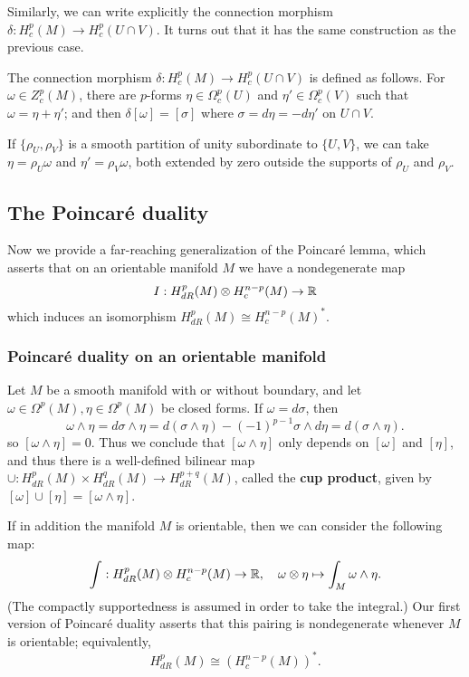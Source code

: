 Similarly, we can write explicitly the connection morphism $\delta:H^p_c(M)\to H^p_c(U\cap V)$. It turns out that it has the same construction as the previous case.
\begin{corollary}\label{Mayer-Vietoris de Rham compact connect}
The connection morphism $\delta:H^p_c(M)\to H^p_c(U\cap V)$ is defined as follows. For $\omega\in Z^p_c(M)$, there are $p$-forms $\eta\in\Omega^p_c(U)$ and 
$\eta'\in\Omega^p_c(V)$ such that $\omega=\eta+\eta'$; and then $\delta[\omega]=[\sigma]$ where $\sigma=d\eta=-d\eta'$ on $U\cap V$.\par
If $\{\rho_U,\rho_V\}$ is a smooth partition of unity subordinate to $\{U,V\}$, we can take $\eta=\rho_U\omega$ and $\eta'=\rho_V\omega$, both extended by zero outside 
the supports of $\rho_U$ and $\rho_V$.
\end{corollary}
\subsection{The Poincar\'e duality}
Now we provide a far-reaching generalization of the Poincar\'e lemma, which asserts that on an orientable manifold $M$ we have a nondegenerate map
\[I:H^p_{dR}(M)\otimes H^{n-p}_c(M)\to\mathbb{R}\]
which induces an isomorphism $H^p_{dR}(M)\cong H^{n-p}_c(M)^*$.
\subsubsection{Poincar\'e duality on an orientable manifold}
Let $M$ be a smooth manifold with or without boundary, and let $\omega\in\Omega^p(M),\eta\in\Omega^p(M)$ be closed forms. If $\omega=d\sigma$, then
\[\omega\wedge\eta= d\sigma\wedge\eta=d(\sigma\wedge\eta)-(-1)^{p-1}\sigma\wedge d\eta=d(\sigma\wedge\eta).\]
so $[\omega\wedge\eta]=0$. Thus we conclude that $[\omega\wedge\eta]$ only depends on $[\omega]$ and $[\eta]$, and thus there is a well-defined bilinear map 
$\cup:H^p_{dR}(M)\times H^q_{dR}(M)\to H_{dR}^{p+q}(M)$, called the \textbf{cup product}, given by $[\omega]\cup[\eta]=[\omega\wedge\eta]$.\par
If in addition the manifold $M$ is orientable, then we can consider the following map:
\[\int:H^p_{dR}(M)\otimes H^{n-p}_c(M)\to\mathbb{R},\quad \omega\otimes\eta\mapsto\int_M\omega\wedge\eta.\]
(The compactly supportedness is assumed in order to take the integral.) Our first version of Poincar\'e duality asserts that this pairing is nondegenerate whenever $M$ 
is orientable; equivalently,
\[H^p_{dR}(M)\cong(H_c^{n-p}(M))^*.\]

